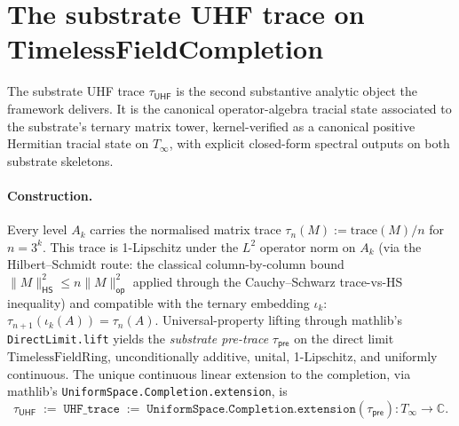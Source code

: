 \documentclass[11pt,a4paper]{amsart}
\theoremstyle{plain}
\theoremstyle{definition}
\begin{document}
\section{The substrate UHF trace on TimelessFieldCompletion}\label{sec:tracial-state}

The substrate UHF trace $\tau_{\textsf{UHF}}$ is the second substantive analytic object the framework delivers. It is the canonical operator-algebra tracial state associated to the substrate's ternary matrix tower, kernel-verified as a canonical positive Hermitian tracial state on $T_\infty$, with explicit closed-form spectral outputs on both substrate skeletons.

\paragraph{Construction.} Every level $A_k$ carries the normalised matrix trace $\tau_n(M) := \mathrm{trace}(M)/n$ for $n = 3^k$. This trace is 1-Lipschitz under the $L^2$ operator norm on $A_k$ (via the Hilbert--Schmidt route: the classical column-by-column bound $\|M\|_{\textsf{HS}}^2 \le n \|M\|_{\textsf{op}}^2$ applied through the Cauchy--Schwarz trace-vs-HS inequality) and compatible with the ternary embedding $\iota_k$: $\tau_{n+1}(\iota_k(A)) = \tau_n(A)$. Universal-property lifting through mathlib's \texttt{DirectLimit.lift} yields the \emph{substrate pre-trace} $\tau_{\textsf{pre}}$ on the direct limit $\mathrm{TimelessFieldRing}$, unconditionally additive, unital, 1-Lipschitz, and uniformly continuous. The unique continuous linear extension to the completion, via mathlib's \texttt{UniformSpace.Completion.extension}, is
\[
\tau_{\textsf{UHF}} \;:=\; \texttt{UHF\_trace} \;:=\; \texttt{UniformSpace.Completion.extension}(\tau_{\textsf{pre}}) \colon T_\infty \to \mathbb{C}.
\]
\end{document}
